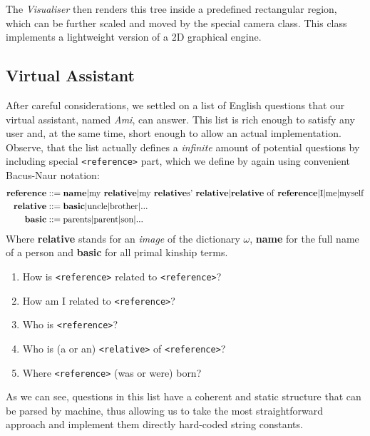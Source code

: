     The \textit{Visualiser} then renders this tree inside a predefined rectangular region, which can be further scaled and moved by
    the special camera class. This class implements a lightweight version of a 2D graphical engine.

    \subsection{Virtual Assistant}
    After careful considerations, we settled on a list of English questions that our virtual assistant, named \textit{Ami}, can answer.
    This list is rich enough to satisfy any user and, at the same time, short enough to allow an actual implementation.
    Observe, that the list actually defines a \textit{infinite} amount of potential questions by including special
    \texttt{<reference>} part, which we define by again using convenient Bacus-Naur notation:
    \begin{align*}
        \text{\textbf{reference}} &::= \text{\textbf{name}} | \text{my \textbf{relative}} |
        \text{my \textbf{relative}s' \textbf{relative}} | \text{\textbf{relative} of \textbf{reference}} | \text{I} | \text{me} |
        \text{myself} \\
        \text{\textbf{relative}} &::= \text{\textbf{basic}} | \text{uncle} | \text{brother} | ... \\
        \text{\textbf{basic}} &::= \text{parents} | \text{parent} | \text{son} | ...
    \end{align*}
    Where \textbf{relative} stands for an \textit{image} of the dictionary $\omega$, \textbf{name} for the full name of a person and
    \textbf{basic} for all primal kinship terms.

    \begin{enumerate}
        \item{How is \texttt{<reference>} related to \texttt{<reference>}?}
        \item{How am I related to \texttt{<reference>}?}
        \item{Who is \texttt{<reference>}?}
        \item{Who is (a or an) \texttt{<relative>} of \texttt{<reference>}?}
        \item{Where \texttt{<reference>} (was or were) born?}
    \end{enumerate}
    As we can see, questions in this list have a coherent and static structure that can be parsed by machine, thus allowing us to take
    the most straightforward approach and implement them directly hard-coded string constants.

